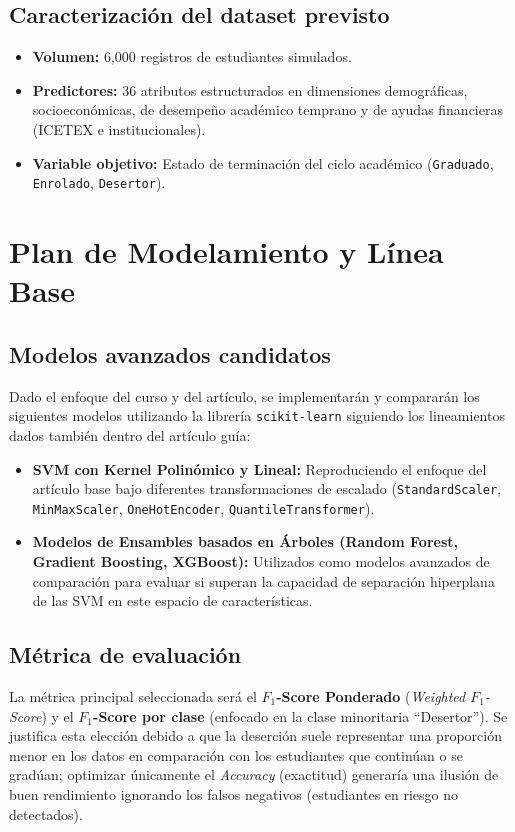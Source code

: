\documentclass[12pt,a4paper]{article}
\begin{document}
\subsection{Caracterización del dataset previsto}
\begin{itemize}
    \item \textbf{Volumen:} 6,000 registros de estudiantes simulados.
    \item \textbf{Predictores:} 36 atributos estructurados en dimensiones demográficas, socioeconómicas, de desempeño académico temprano y de ayudas financieras (ICETEX e institucionales).
    \item \textbf{Variable objetivo:} Estado de terminación del ciclo académico (\texttt{Graduado}, \texttt{Enrolado}, \texttt{Desertor}).
\end{itemize}

\section{Plan de Modelamiento y Línea Base}

\subsection{Modelos avanzados candidatos}
Dado el enfoque del curso y del artículo, se implementarán y compararán los siguientes modelos utilizando la librería \texttt{scikit-learn} siguiendo los lineamientos dados también dentro del artículo guía:
\begin{itemize}
    \item \textbf{SVM con Kernel Polinómico y Lineal:} Reproduciendo el enfoque del artículo base bajo diferentes transformaciones de escalado (\texttt{StandardScaler}, \texttt{MinMaxScaler}, \texttt{OneHotEncoder}, \texttt{QuantileTransformer}).
    \item \textbf{Modelos de Ensambles basados en Árboles (Random Forest, Gradient Boosting, XGBoost):} Utilizados como modelos avanzados de comparación para evaluar si superan la capacidad de separación hiperplana de las SVM en este espacio de características.
\end{itemize}

\subsection{Métrica de evaluación}
La métrica principal seleccionada será el \textbf{$F_1$-Score Ponderado} (\textit{Weighted $F_1$-Score}) y el \textbf{$F_1$-Score por clase} (enfocado en la clase minoritaria ``Desertor''). Se justifica esta elección debido a que la deserción suele representar una proporción menor en los datos en comparación con los estudiantes que continúan o se gradúan; optimizar únicamente el \textit{Accuracy} (exactitud) generaría una ilusión de buen rendimiento ignorando los falsos negativos (estudiantes en riesgo no detectados).
\end{document}
